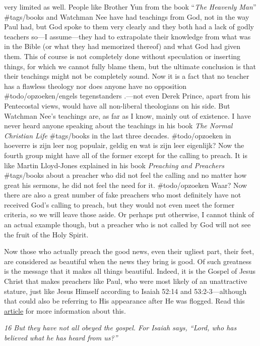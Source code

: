 very limited as well. People like Brother Yun from the book ``\emph{The
Heavenly Man}'' \#tags/books and Watchman Nee have had teachings from
God, not in the way Paul had, but God spoke to them very clearly and
they both had a lack of godly teachers so---I assume---they had to
extrapolate their knowledge from what was in the Bible (or what they had
memorized thereof) and what God had given them. This of course is not
completely done without speculation or inserting things, for which we
cannot fully blame them, but the ultimate conclusion is that their
teachings might not be completely sound. Now it is a fact that no
teacher has a flawless theology nor does anyone have no opposition
\#todo/opzoeken/engels tegenstanders .---not even Derek Prince, apart
from his Pentecostal views, would have all non-liberal theologians on
his side. But Watchman Nee's teachings are, as far as I know, mainly out
of existence. I have never heard anyone speaking about the teachings in
his book \emph{The Normal Christian Life} \#tags/books in the last three
decades. \#todo/opzoeken in hoeverre is zijn leer nog populair, geldig
en wat is zijn leer eigenlijk? Now the fourth group might have all of
the former except for the calling to preach. It is like Martin
Lloyd-Jones explained in his book \emph{Preaching and Preachers}
\#tags/books about a preacher who did not feel the calling and no matter
how great his sermons, he did not feel the need for it. \#todo/opzoeken
Waar? Now there are also a great number of fake preachers who most
definitely have not received God's calling to preach, but they would not
even meet the former criteria, so we will leave those aside. Or perhaps
put otherwise, I cannot think of an actual example though, but a
preacher who is not called by God will not see the fruit of the Holy
Spirit.

Now those who actually preach the good news, even their ugliest part,
their feet, are considered as beautiful when the news they bring is
good. Of such greatness is the message that it makes all things
beautiful. Indeed, it is the Gospel of Jesus Christ that makes preachers
like Paul, who were most likely of an unattractive stature, just like
Jesus Himself according to Isaiah 52:14 and 53:2-3---although that could
also be referring to His appearance after He was flogged. Read this
\href{http://www.bergsland.org/2011/06/recentposts/how-ugly-was-jesus/}{article}
for more information about this.

\emph{16 But they have not all obeyed the gospel. For Isaiah says,
``Lord, who has believed what he has heard from us?''}

